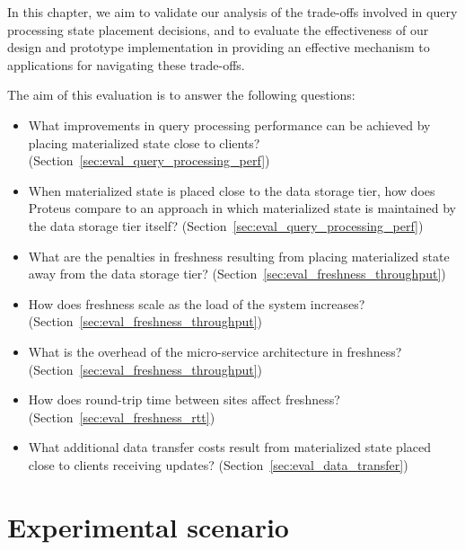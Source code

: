 
In this chapter, we aim to validate our analysis of the trade-offs involved in query processing state placement decisions,
and to evaluate the effectiveness of our design and prototype implementation in providing an effective mechanism to applications
for navigating these trade-offs.

The aim of this evaluation is to answer the following questions:

\begin{itemize}

  \item What improvements in query processing performance can be achieved by placing materialized state close to clients?
  (Section~\ref{sec:eval_query_processing_perf})

  \item When materialized state is placed close to the data storage tier,
  how does Proteus compare to an approach in which materialized state is maintained by the data storage tier itself?
  (Section~\ref{sec:eval_query_processing_perf})

  \item What are the penalties in freshness resulting from placing materialized state away from the data storage tier?
  (Section~\ref{sec:eval_freshness_throughput})

  \item How does freshness scale as the load of the system increases? (Section~\ref{sec:eval_freshness_throughput})

  \item What is the overhead of the micro-service architecture in freshness? (Section~\ref{sec:eval_freshness_throughput})

  \item How does round-trip time between sites affect freshness? (Section~\ref{sec:eval_freshness_rtt})

  \item What additional data transfer costs result from materialized state placed close to clients receiving updates?
  (Section~\ref{sec:eval_data_transfer})

\end{itemize}


\section{Experimental scenario}
\label{sec:eval_scenario}

